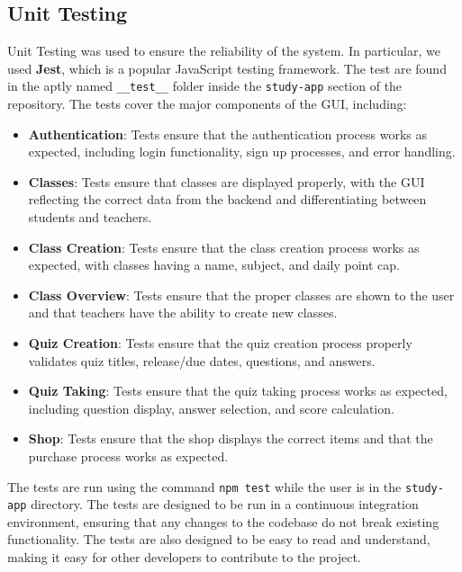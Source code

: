 \subsection{Unit Testing}
Unit Testing was used to ensure the reliability of the system. In particular, we used \textbf{Jest}, which is a popular JavaScript testing framework. The test are found in the aptly named \texttt{\_\_test\_\_} folder inside the \texttt{study-app} section of the repository. The tests cover the major components of the GUI, including:
\begin{itemize}
    \item \textbf{Authentication}: Tests ensure that the authentication process works as expected, including login functionality, sign up processes, and error handling.
    \item \textbf{Classes}: Tests ensure that classes are displayed properly, with the GUI reflecting the correct data from the backend and differentiating between students and teachers.
    \item \textbf{Class Creation}: Tests ensure that the class creation process works as expected, with classes having a name, subject, and daily point cap.
    \item \textbf{Class Overview}: Tests ensure that the proper classes are shown to the user and that teachers have the ability to create new classes.
    \item \textbf{Quiz Creation}: Tests ensure that the quiz creation process properly validates quiz titles, release/due dates, questions, and answers.
    \item \textbf{Quiz Taking}: Tests ensure that the quiz taking process works as expected, including question display, answer selection, and score calculation.
    \item \textbf{Shop}: Tests ensure that the shop displays the correct items and that the purchase process works as expected.
\end{itemize}

The tests are run using the command \texttt{npm test} while the user is in the \texttt{study-app} directory. The tests are designed to be run in a continuous integration environment, ensuring that any changes to the codebase do not break existing functionality. The tests are also designed to be easy to read and understand, making it easy for other developers to contribute to the project.